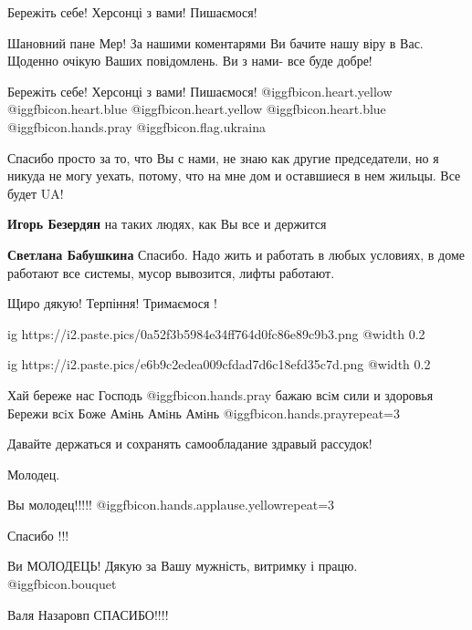 \begin{itemize}
Бережіть себе! Херсонці з вами! Пишаємося!


Шановний пане Мер! За нашими коментарями Ви бачите нашу віру в Вас. Щоденно
очікую Ваших повідомлень. Ви з нами- все буде добре!

Бережіть себе! Херсонці з вами! Пишаємося!  @igg{fbicon.heart.yellow}  @igg{fbicon.heart.blue}  @igg{fbicon.heart.yellow}  @igg{fbicon.heart.blue}  @igg{fbicon.hands.pray} @igg{fbicon.flag.ukraina}


Спасибо просто за то, что Вы с нами, не знаю как другие председатели, но я
никуда не могу уехать, потому, что на мне дом и оставшиеся в нем жильцы. Все
будет UA!

\begin{itemize} %
\textbf{Игорь Безердян} на таких людях, как Вы все и держится

\textbf{Светлана Бабушкина} Спасибо. Надо жить и работать в любых условиях, в доме работают все системы, мусор вывозится, лифты работают.
\end{itemize} %

Щиро дякую! Терпіння! Тримаємося !


\ifcmt
  ig https://i2.paste.pics/0a52f3b5984e34ff764d0fc86e89c9b3.png
  @width 0.2
\fi


\ifcmt
  ig https://i2.paste.pics/e6b9c2edea009cfdad7d6c18efd35c7d.png
  @width 0.2
\fi


Хай береже нас Господь  @igg{fbicon.hands.pray}  бажаю всiм сили и здоровья Бережи всiх Боже Амiнь Амiнь Амiнь  @igg{fbicon.hands.pray}{repeat=3} 

Давайте держаться и сохранять самообладание здравый рассудок!

Молодец.

Вы молодец!!!!! @igg{fbicon.hands.applause.yellow}{repeat=3} 

Спасибо !!!

Ви МОЛОДЕЦЬ! Дякую за Вашу мужність, витримку і працю. @igg{fbicon.bouquet} 

Валя Назаровп
СПАСИБО!!!!


\end{itemize}
